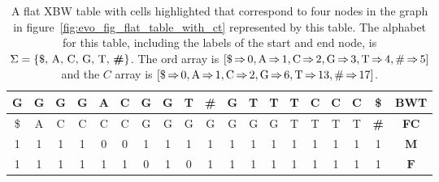 \documentclass[a4paper,12pt,twoside,BCOR=10mm]{scrbook}
\begin{document}
{
\begin{table}[htb]
\centering
\caption[Flat table corresponding to a graph]{A flat XBW table with cells highlighted that correspond to four nodes in the graph in figure~\ref{fig:evo_fig_flat_table_with_ct} represented by this table. The alphabet for this table, including the labels of the start and end node, is $ \Sigma = \{ \textup{\$, A, C, G, T, \textbf{\#}} \} $. The \textup{ord} array is $ [ \$ {\, \Rightarrow \,} 0, \textup{A} {\, \Rightarrow \,} 1, \textup{C} {\, \Rightarrow \,} 2, \textup{G} {\, \Rightarrow \,} 3, \textup{T} {\, \Rightarrow \,} 4, \textup{\#} {\, \Rightarrow \,} 5 ] $ and the $ C $ array is $ [ \$ {\, \Rightarrow \,} 0, \textup{A} {\, \Rightarrow \,} 1, \textup{C} {\, \Rightarrow \,} 2, \textup{G} {\, \Rightarrow \,} 6, \textup{T} {\, \Rightarrow \,} 13, \textup{\#} {\, \Rightarrow \,} 17 ] $.}
\begin{tabular}{ | c | c | c | c | c | c | c | c | c | c | c | c | c | c | c | c | c | c | c | }
\hline
G & G & G &\cellcolor{purple_bg}\color{purple_fx}G & A & C & G &\cellcolor{green_bg}\color{green_fx}G &\cellcolor{green_bg}\color{green_fx}T & \textbf{\#} & G & T & T &\cellcolor{red_bg}\color{red_fx}T & C & C &\cellcolor{blue_bg}\color{blue_fx}C & \$ & \textbf{BWT} \\ \hline 
\$ & A & C &\cellcolor{purple_bg}\color{purple_fx}C &\cellcolor{purple_bg}\color{purple_fx}C &\cellcolor{purple_bg}\color{purple_fx}C & G & G &\cellcolor{green_bg}\color{green_fx}G & G & G & G & G &\cellcolor{red_bg}\color{red_fx}T & T & T &\cellcolor{blue_bg}\color{blue_fx}T & \textbf{\#} & \textbf{FC} \\ \hline 
1 & 1 & 1 &\cellcolor{purple_bg}\color{purple_fx}1 &\cellcolor{purple_bg}\color{purple_fx}0 &\cellcolor{purple_bg}\color{purple_fx}0 & 1 & 1 &\cellcolor{green_bg}\color{green_fx}1 & 1 & 1 & 1 & 1 &\cellcolor{red_bg}\color{red_fx}1 & 1 & 1 &\cellcolor{blue_bg}\color{blue_fx}1 & 1 & $\boldsymbol{M}$ \\ \hline 
1 & 1 & 1 &\cellcolor{purple_bg}\color{purple_fx}1 & 1 & 1 & 0 &\cellcolor{green_bg}\color{green_fx}1 &\cellcolor{green_bg}\color{green_fx}0 & 1 & 1 & 1 & 1 &\cellcolor{red_bg}\color{red_fx}1 & 1 & 1 &\cellcolor{blue_bg}\color{blue_fx}1 & 1 & $\boldsymbol{F}$ \\ \hline 
\end{tabular}
\label{table:flat_table_with_ct}
\end{table}
}
\end{document}
